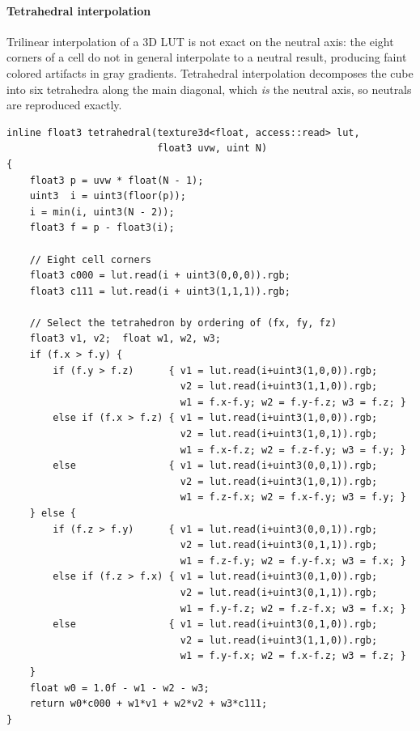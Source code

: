 \paragraph{Tetrahedral interpolation} Trilinear interpolation of a 3D LUT is
not exact on the neutral axis: the eight corners of a cell do not in general
interpolate to a neutral result, producing faint colored artifacts in gray
gradients. Tetrahedral interpolation \cite{kang2006} decomposes the cube into
six tetrahedra
along the main diagonal, which \emph{is} the neutral axis, so neutrals are
reproduced exactly.

\begin{lstlisting}[language=Metal, caption={Tetrahedral 3D LUT interpolation.}, label={lst:tetra}]
inline float3 tetrahedral(texture3d<float, access::read> lut,
                          float3 uvw, uint N)
{
    float3 p = uvw * float(N - 1);
    uint3  i = uint3(floor(p));
    i = min(i, uint3(N - 2));
    float3 f = p - float3(i);

    // Eight cell corners
    float3 c000 = lut.read(i + uint3(0,0,0)).rgb;
    float3 c111 = lut.read(i + uint3(1,1,1)).rgb;

    // Select the tetrahedron by ordering of (fx, fy, fz)
    float3 v1, v2;  float w1, w2, w3;
    if (f.x > f.y) {
        if (f.y > f.z)      { v1 = lut.read(i+uint3(1,0,0)).rgb;
                              v2 = lut.read(i+uint3(1,1,0)).rgb;
                              w1 = f.x-f.y; w2 = f.y-f.z; w3 = f.z; }
        else if (f.x > f.z) { v1 = lut.read(i+uint3(1,0,0)).rgb;
                              v2 = lut.read(i+uint3(1,0,1)).rgb;
                              w1 = f.x-f.z; w2 = f.z-f.y; w3 = f.y; }
        else                { v1 = lut.read(i+uint3(0,0,1)).rgb;
                              v2 = lut.read(i+uint3(1,0,1)).rgb;
                              w1 = f.z-f.x; w2 = f.x-f.y; w3 = f.y; }
    } else {
        if (f.z > f.y)      { v1 = lut.read(i+uint3(0,0,1)).rgb;
                              v2 = lut.read(i+uint3(0,1,1)).rgb;
                              w1 = f.z-f.y; w2 = f.y-f.x; w3 = f.x; }
        else if (f.z > f.x) { v1 = lut.read(i+uint3(0,1,0)).rgb;
                              v2 = lut.read(i+uint3(0,1,1)).rgb;
                              w1 = f.y-f.z; w2 = f.z-f.x; w3 = f.x; }
        else                { v1 = lut.read(i+uint3(0,1,0)).rgb;
                              v2 = lut.read(i+uint3(1,1,0)).rgb;
                              w1 = f.y-f.x; w2 = f.x-f.z; w3 = f.z; }
    }
    float w0 = 1.0f - w1 - w2 - w3;
    return w0*c000 + w1*v1 + w2*v2 + w3*c111;
}
\end{lstlisting}

